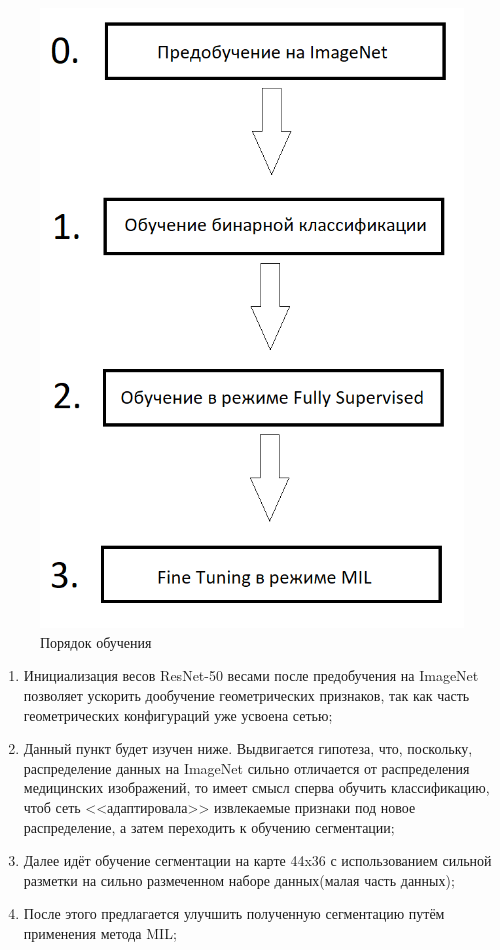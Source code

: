 \begin{figure}[h] 
  \center
  \includegraphics [scale=0.6] {images/schema.png}
  \caption{Порядок обучения} 
  \label{fig:schema_order}  
\end{figure}


\begin{enumerate}[start=0]
    \item Инициализация весов ResNet-50 весами после предобучения на ImageNet позволяет ускорить дообучение геометрических признаков, так как часть геометрических конфигураций уже усвоена сетью;
    \item Данный пункт будет изучен ниже. Выдвигается гипотеза, что, поскольку, распределение данных на ImageNet сильно отличается от распределения медицинских изображений, то имеет смысл сперва обучить классификацию, чтоб сеть <<адаптировала>> извлекаемые признаки под новое распределение, а затем переходить к обучению сегментации;  
    \item Далее идёт обучение сегментации на карте 44x36 с использованием сильной разметки на сильно размеченном наборе данных(малая часть данных);
    \item После этого предлагается улучшить полученную сегментацию путём применения метода MIL;
\end{enumerate}



